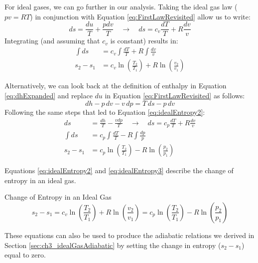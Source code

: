 For ideal gases, we can go further in our analysis.  Taking the ideal gas law ($pv = RT$) in conjunction with Equation \ref{eq:FirstLawRevisited} allow us to write:
\begin{equation} \label{eq:idealEntropy1}
  ds  = \frac{du}{T}+ \frac{pdv}{T} \quad\rightarrow\quad ds = c_v \frac{dT}{T} + R\frac{dv}{v}
\end{equation}
Integrating \label{eq:idealEntropy1} (and assuming that $c_v$ is constant) results in:
\begin{align} 
  \nonumber  \int ds &= c_v \int \frac{dT}{T} + R \int \frac{dv}{v} \\
  \label{eq:idealEntropy2} s_2 - s_1 &= c_v \ln \left(\frac{T_2}{T_1}\right) + R \ln \left(\frac{v_2}{v_1}\right)
\end{align}

Alternatively, we can look back at the definition of enthalpy in Equation \ref{eq:dhExpanded} and replace $du$ in Equation \ref{eq:FirstLawRevisited} as follows:
\begin{equation*}
  dh - p\,dv - v\,dp = T\,ds - p\,dv
\end{equation*}
Following the same steps that led to Equation \ref{eq:idealEntropy2}:
\begin{align}
  \nonumber ds  &= \frac{dh}{T}- \frac{vdp}{T} \quad \rightarrow\quad ds = c_p \frac{dT}{T} + R\frac{dv}{v} \\
  \nonumber  \int ds &= c_p \int \frac{dT}{T} - R \int \frac{dp}{p} \\
  \label{eq:idealEntropy3} s_2 - s_1 &= c_p \ln \left(\frac{T_2}{T_1}\right) - R \ln \left(\frac{p_2}{p_1}\right)
\end{align}

Equations \ref{eq:idealEntropy2} and \ref{eq:idealEntropy3} describe the change of entropy in an ideal gas.

\begin{quoteWithTitle}{Change of Entropy in an Ideal Gas}%
  \begin{equation*}
    s_2 - s_1 = c_v \ln \left(\frac{T_2}{T_1}\right) + R \ln \left(\frac{v_2}{v_1}\right) =
    c_p \ln \left(\frac{T_2}{T_1}\right) - R \ln \left(\frac{p_2}{p_1}\right)
  \end{equation*}
\end{quoteWithTitle}

These equations can also be used to produce the adiabatic relations we derived in Section \ref{sec:ch3_idealGasAdiabatic} by setting the change in entropy ($s_2 -s_1$) equal to zero.

